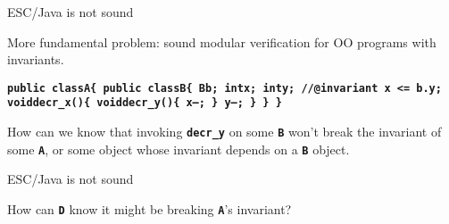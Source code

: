\documentclass[
pdf,
nocolorBG,
slideColor,
cok,
]{prosper}
\newcommand{\Red}[1]{{\red #1}}
\newcommand{\code}[1]{{\rm \texttt{\textbf{\scriptsize #1}}}}
\begin{document}
\begin{slide}{ESC/Java is not sound}
\vspace*{-6ex}

More fundamental problem: {\green sound modular verification for OO programs
with invariants}.
\begin{alltt}\texttt{\textbf{\footnotesize public class{\green A}\{               public class{\green B}\{
  B{\green b};                         
  int{\green x};                       int{\green y};
  //@{\blue invariant x <= b.y;}        
  void{\green decr\_x}()\{                void{\green decr\_y}()\{          
    x--;  \}                          y--; \}
 \}                            \}
}}
\end{alltt}

How can we know that invoking \code{decr\_y} on some \code{B} won't break
the invariant of some \code{A}, or some object whose invariant
depends on a \code{B} object.



\end{slide}

\begin{slide}{ESC/Java is not sound}
\vspace*{-7ex}


How can \code{D} know it might be breaking \code{A}'s invariant?

\end{slide}
\end{document}

